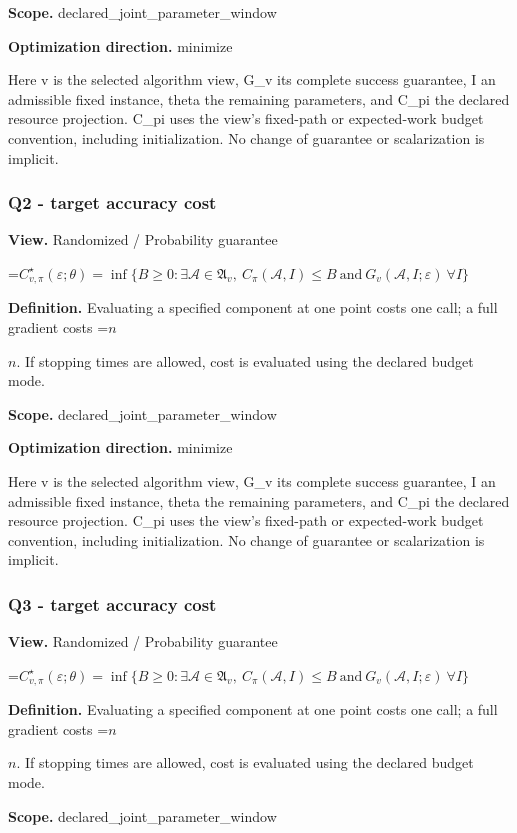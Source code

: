 \documentclass[10pt,a4paper]{article}
\newcommand{\AtlasMath}[1]{\par\begingroup\centering\setbox0=\hbox{$\displaystyle #1$}\ifdim\wd0>1.4\linewidth\typeout{ATLAS WIDE FORMULA: \the\wd0}\fi\ifdim\wd0>\linewidth\resizebox{\linewidth}{!}{\box0}\else\box0\fi\par\endgroup}
\newcommand{\AtlasInlineMath}[1]{\begingroup\setbox0=\hbox{$#1$}\ifdim\wd0>.4\linewidth\endgroup\AtlasMath{#1}\else\endgroup$#1$\fi}
\begin{document}
\textbf{Scope.} declared\_joint\_parameter\_window

\textbf{Optimization direction.} minimize

Here v is the selected algorithm view, G\_v its complete success guarantee, I an admissible fixed instance, theta the remaining parameters, and C\_pi the declared resource projection. C\_pi uses the view's fixed-path or expected-work budget convention, including initialization. No change of guarantee or scalarization is implicit.

\subsubsection{Q2 - target accuracy cost}
\textbf{View.} Randomized / Probability guarantee

\AtlasMath{C^\star_{v,\pi}(\varepsilon;\theta)=\inf\{B\ge0:\exists\mathcal A\in\mathfrak A_v,\ C_\pi(\mathcal A,I)\le B\ \text{and}\ G_v(\mathcal A,I;\varepsilon)\ \forall I\}}
\textbf{Definition.} Evaluating a specified component at one point costs one call; a full gradient costs \AtlasInlineMath{n}. If stopping times are allowed, cost is evaluated using the declared budget mode.

\textbf{Scope.} declared\_joint\_parameter\_window

\textbf{Optimization direction.} minimize

Here v is the selected algorithm view, G\_v its complete success guarantee, I an admissible fixed instance, theta the remaining parameters, and C\_pi the declared resource projection. C\_pi uses the view's fixed-path or expected-work budget convention, including initialization. No change of guarantee or scalarization is implicit.

\subsubsection{Q3 - target accuracy cost}
\textbf{View.} Randomized / Probability guarantee

\AtlasMath{C^\star_{v,\pi}(\varepsilon;\theta)=\inf\{B\ge0:\exists\mathcal A\in\mathfrak A_v,\ C_\pi(\mathcal A,I)\le B\ \text{and}\ G_v(\mathcal A,I;\varepsilon)\ \forall I\}}
\textbf{Definition.} Evaluating a specified component at one point costs one call; a full gradient costs \AtlasInlineMath{n}. If stopping times are allowed, cost is evaluated using the declared budget mode.

\textbf{Scope.} declared\_joint\_parameter\_window
\end{document}
